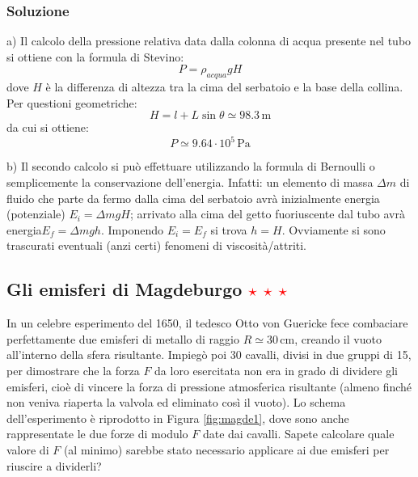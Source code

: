\documentclass[12pt,a4paper]{book}
\newcommand{\rstar}{ \textcolor{red}{$\star$}}
\begin{document}
\subsubsection*{Soluzione}
a) Il calcolo della pressione relativa data dalla colonna di acqua presente nel tubo si ottiene 
con la formula di Stevino: 
\begin{equation*}
P=\rho_{acqua} g H
\end{equation*}
dove $H$ è la differenza di altezza tra la cima del serbatoio e la base della collina. Per questioni geometriche:
\begin{equation*}
H=l + L \sin \theta  \simeq 98.3 \, \text{m}
\end{equation*}
da cui si ottiene:
\begin{equation*}
P \simeq 9.64 \cdot 10^5 \, \text{Pa}
\end{equation*}

b) Il secondo calcolo si può effettuare utilizzando la formula di Bernoulli o semplicemente la conservazione
dell'energia. Infatti: un elemento di massa $\Delta m$ di fluido che parte da fermo dalla cima del serbatoio
avrà inizialmente energia (potenziale) $E_i=\Delta m gH$; arrivato alla cima del getto fuoriuscente dal tubo avrà energia$E_f=\Delta m g h$. Imponendo $E_i=E_f$ si trova $h=H$. Ovviamente si sono trascurati eventuali (anzi certi) fenomeni di viscosità/attriti. 

\subsection{Gli emisferi di Magdeburgo \rstar \rstar \rstar}
In un celebre esperimento del 1650, il tedesco Otto von Guericke fece combaciare perfettamente due emisferi di metallo di raggio $R\simeq 30 \,$cm, creando il vuoto all'interno della sfera risultante. Impiegò poi 30 cavalli, divisi in due gruppi di 15, per dimostrare che la forza $F$ da loro esercitata non era in grado di dividere gli emisferi, cioè di vincere la forza di pressione atmosferica risultante (almeno finché non veniva riaperta la valvola ed eliminato così il vuoto). Lo schema dell'esperimento è riprodotto in Figura \ref{fig:magde1}, dove sono anche rappresentate le due forze di modulo $F$ date dai cavalli.  Sapete calcolare quale valore di $F$ (al minimo) sarebbe stato necessario applicare ai due emisferi per riuscire a dividerli? \\
\end{document}
